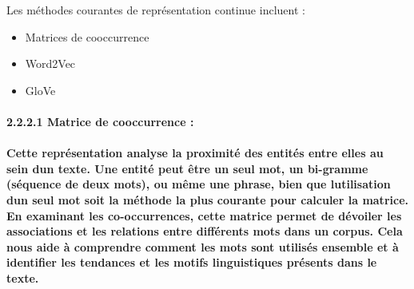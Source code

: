 \documentclass[
]{article}
\begin{document}
Les méthodes courantes de représentation continue incluent :

\begin{itemize}
\item
  Matrices de cooccurrence
\item
  Word2Vec
\item
  GloVe
\end{itemize}

\paragraph{2.2.2.1 Matrice de cooccurrence
:}\label{matrice-de-cooccurrence}

\paragraph{\texorpdfstring{Cette représentation analyse la proximité des
entités entre elles au sein d\textquotesingle un texte. Une entité peut
être un seul mot, un bi-gramme (séquence de deux mots), ou même une
phrase, bien que l\textquotesingle utilisation d\textquotesingle un seul
mot soit la méthode la plus courante pour calculer la matrice. En
examinant les co-occurrences, cette matrice permet de dévoiler les
associations et les relations entre différents mots dans un corpus. Cela
nous aide à comprendre comment les mots sont utilisés ensemble et à
identifier les tendances et les motifs linguistiques présents dans le
texte.
}{Cette représentation analyse la proximité des entités entre elles au sein d\textquotesingle un texte. Une entité peut être un seul mot, un bi-gramme (séquence de deux mots), ou même une phrase, bien que l\textquotesingle utilisation d\textquotesingle un seul mot soit la méthode la plus courante pour calculer la matrice. En examinant les co-occurrences, cette matrice permet de dévoiler les associations et les relations entre différents mots dans un corpus. Cela nous aide à comprendre comment les mots sont utilisés ensemble et à identifier les tendances et les motifs linguistiques présents dans le texte. }}\label{cette-repruxe9sentation-analyse-la-proximituxe9-des-entituxe9s-entre-elles-au-sein-dun-texte.-une-entituxe9-peut-uxeatre-un-seul-mot-un-bi-gramme-suxe9quence-de-deux-mots-ou-muxeame-une-phrase-bien-que-lutilisation-dun-seul-mot-soit-la-muxe9thode-la-plus-courante-pour-calculer-la-matrice.-en-examinant-les-co-occurrences-cette-matrice-permet-de-duxe9voiler-les-associations-et-les-relations-entre-diffuxe9rents-mots-dans-un-corpus.-cela-nous-aide-uxe0-comprendre-comment-les-mots-sont-utilisuxe9s-ensemble-et-uxe0-identifier-les-tendances-et-les-motifs-linguistiques-pruxe9sents-dans-le-texte.}
\end{document}
